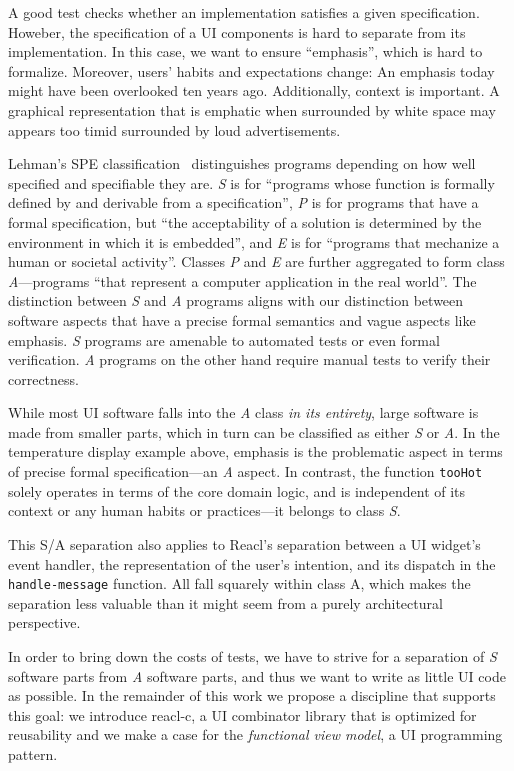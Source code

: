 \documentclass[sigplan,screen]{acmart}
\begin{document}
A good
test checks whether an implementation satisfies a given specification.
Howeber, the specification of a
UI components is hard to separate from its implementation.
In this case, we want to ensure ``emphasis'', which 
is hard to formalize. Moreover, users' habits and expectations
change: An emphasis today might have been overlooked ten years ago. Additionally,
context is important. A graphical representation that is
emphatic when surrounded by white space may appears too timid
surrounded by loud advertisements.

Lehman's SPE classification~\cite{SPE} distinguishes programs
depending on how well specified and specifiable they are.
\textit{S} is for ``programs whose function is formally defined by and
derivable from a specification'', \textit{P} is for programs that have
a formal specification, but ``the acceptability of a solution is
determined by the environment in which it is embedded'', and
\textit{E} is for ``programs that mechanize a human or societal
activity''. Classes \textit{P} and \textit{E} are further aggregated
to form class \textit{A}---programs ``that represent a computer
application in the real world''. The distinction between \textit{S}
and \textit{A} programs aligns with our distinction between software
aspects that have a precise formal semantics and vague aspects like
emphasis. \textit{S} programs are amenable to automated tests
or even formal verification. \textit{A} programs on the other hand require manual tests to
verify their correctness.

While most UI software falls into the \textit{A} class \textit{in its
  entirety}, large software is made from smaller parts, which in turn
can be classified as either \textit{S} or \textit{A}. In the
temperature display example above, 
emphasis is the problematic aspect in terms of precise formal
specification---an \textit{A} aspect. In contrast, the function
\texttt{tooHot} solely operates in terms of the core domain
logic, and is independent of its context or any human habits
or practices---it belongs to class \textit{S}.

This S/A separation also applies to Reacl's separation between a UI
widget's event handler, the representation of the user's intention,
and its dispatch in the \texttt{handle-message} function.  All fall
squarely within class A, which makes the separation less valuable than
it might seem from a purely architectural perspective.

In order to bring down the costs of tests, we have to strive for
a separation of \textit{S} software parts from
\textit{A} software parts, and thus we want to write as little
UI code as possible. In the remainder of this work we propose a
discipline that supports this goal: we introduce reacl-c, a UI
combinator library that is optimized for reusability and we make a
case for the \textit{functional view model}, a UI programming
pattern.
\end{document}
